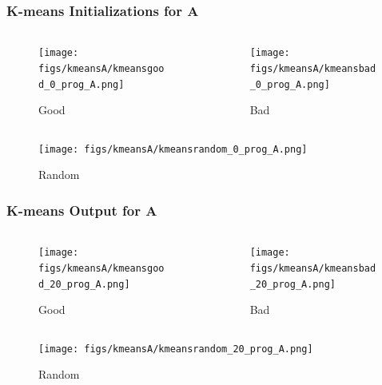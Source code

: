 \documentclass[11pt]{beamer}
\begin{document}
\begin{frame}
\frametitle{K-means Initializations for A}
\begin{columns}[onlytextwidth]
\begin{column}{.45\textwidth}
\begin{figure}
  \texttt{[image: figs/kmeansA/kmeansgood\_0\_prog\_A.png]}
  \caption{Good}
\end{figure}
\end{column}
\hfill
\begin{column}{.45\textwidth}
\begin{figure}
  \texttt{[image: figs/kmeansA/kmeansbad\_0\_prog\_A.png]}
  \caption{Bad}
\end{figure}
\end{column}
\end{columns}\vfill

\begin{figure}
  \texttt{[image: figs/kmeansA/kmeansrandom\_0\_prog\_A.png]}
  \caption{Random}
\end{figure}
\end{frame}


\begin{frame}
\frametitle{K-means Output for A}
\begin{columns}[onlytextwidth]
\begin{column}{.45\textwidth}
\begin{figure}
  \texttt{[image: figs/kmeansA/kmeansgood\_20\_prog\_A.png]}
  \caption{Good}
\end{figure}
\end{column}
\hfill
\begin{column}{.45\textwidth}
\begin{figure}
  \texttt{[image: figs/kmeansA/kmeansbad\_20\_prog\_A.png]}
  \caption{Bad}
\end{figure}
\end{column}
\end{columns}\vfill

\begin{figure}
  \texttt{[image: figs/kmeansA/kmeansrandom\_20\_prog\_A.png]}
  \caption{Random}
\end{figure}
\end{frame}
\end{document}
